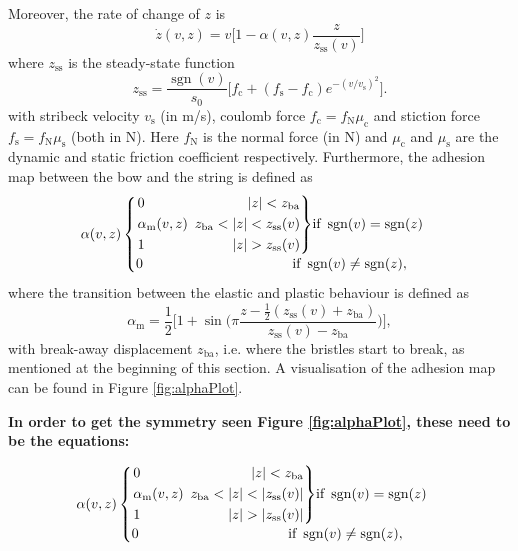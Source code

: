 \documentclass[twoside,a4paper]{article}
\newenvironment{rcases}
  {\left.\begin{alignedat}{2}}
  {\end{alignedat}\right\rbrace}
\DeclareMathOperator{\sgn}{sgn}
\begin{document}
Moreover, the rate of change of $z$ is
\begin{equation}\label{eq:zdot}
    \dot z(v, z) = v\bigg[1-\alpha(v, z)\frac{z}{z_\text{ss}(v)}\bigg]
\end{equation}
where $z_\text{ss}$ is the steady-state function
\begin{equation}
    z_\text{ss} = \frac{\sgn(v)}{s_0}\Big[f_\text{c}+(f_\text{s}-f_\text{c})e^{-(v/v_\text{s})^2}\Big].
\end{equation}
with stribeck velocity $v_\text{s}$ (in m/s), coulomb force $f_\text{c} = f_\text{N}\mu_\text{c}$ and stiction force $f_\text{s} = f_\text{N}\mu_\text{s}$ (both in N). Here $f_\text{N}$ is the normal force (in N) and $\mu_\text{c}$ and $\mu_\text{s}$ are the dynamic and static friction coefficient respectively. 
Furthermore, the adhesion map between the bow and the string is defined as
\begin{equation}\label{eq:adhesionMap}
\alpha(v, z) 
    \begin{cases}
    \begin{rcases}
        &0 & |z| < z_\text{ba}\\
       &\alpha_\text{m}(v,z)&\ \, z_\text{ba}<|z|<z_\text{ss}(v)\\        &1 &|z|>z_\text{ss}(v)
        \end{rcases}\text{if}\  \sgn(v)=\sgn(z)\\
        0\hspace{107pt}\text{if}\  \sgn(v)\neq\sgn(z),
    \end{cases}
\end{equation}
where the transition between the elastic and plastic behaviour is defined as
\begin{equation}
    \alpha_\text{m} = \frac{1}{2}\bigg[1+\sin\bigg(\pi\frac{z-\frac{1}{2}(z_\text{ss}(v)+z_\text{ba})}{z_\text{ss}(v)-z_\text{ba}}\bigg)\bigg],
\end{equation}
with break-away displacement $z_\text{ba}$, i.e. where the bristles start to break, as mentioned at the beginning of this section. A visualisation of the adhesion map can be found in Figure \ref{fig:alphaPlot}.

\textbf{In order to get the symmetry seen Figure \ref{fig:alphaPlot}, these need to be the equations:}

\begin{equation}\label{eq:adhesionMap}
\alpha(v, z) 
    \begin{cases}
    \begin{rcases}
        &0 & |z| < z_\text{ba}\\
       &\alpha_\text{m}(v,z)&\ \, z_\text{ba}<|z|<|z_\text{ss}(v)|\\        &1 &|z|>|z_\text{ss}(v)|
        \end{rcases}\text{if}\  \sgn(v)=\sgn(z)\\
        0\hspace{107pt}\text{if}\  \sgn(v)\neq\sgn(z),
    \end{cases}
\end{equation}
\end{document}
